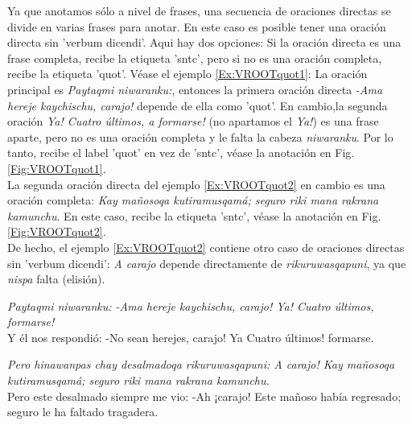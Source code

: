 \documentclass[a4paper,11pt,DIV12]{scrartcl}
\begin{document}
Ya que anotamos s\'olo a nivel de frases, una secuencia de oraciones directas se divide en varias frases para anotar. En este caso es posible tener una oraci\'on directa sin 'verbum dicendi'. Aqui hay dos opciones: Si la oraci\'on directa es una frase completa, recibe la etiqueta 'sntc', pero si no es una oraci\'on completa, recibe la etiqueta 'quot'. V\'ease el ejemplo \ref{Ex:VROOTquot1}: La oraci\'on principal es {\em Paytaqmi niwaranku:}, entonces la primera oraci\'on directa {\em -Ama hereje kaychischu, carajo!} depende de ella como 'quot'. En cambio,la segunda oraci\'on {\em Ya! Cuatro \'ultimos, a formarse!} (no apartamos el {\em Ya!}) es una frase aparte, pero no es una oraci\'on completa y le falta la cabeza {\em niwaranku}.
Por lo tanto, recibe el label 'quot' en vez de 'sntc', v\'ease la anotaci\'on en Fig. \ref{Fig:VROOTquot1}.\\
La segunda oraci\'on directa del ejemplo \ref{Ex:VROOTquot2} en cambio es una oraci\'on completa: {\em Kay mañosoqa kutiramusqamá; seguro riki mana rakrana kamunchu}. En este caso, recibe la etiqueta 'sntc', v\'ease la anotaci\'on en Fig. \ref{Fig:VROOTquot2}.\\
De hecho, el ejemplo \ref{Ex:VROOTquot2} contiene otro caso de oraciones directas sin 'verbum dicendi': {\em A carajo} depende directamente de {\em rikuruwasqapuni}, ya que {\em nispa} falta (elisi\'on). 
\begin{examples}
 \item\label{Ex:VROOTquot1} {\em Paytaqmi niwaranku: -Ama hereje kaychischu, carajo! Ya! Cuatro \'ultimos, formarse!}\\
    Y \'el nos respondi\'o: -No sean herejes, {\textexclamdown}carajo! {\textexclamdown}Ya Cuatro \'ultimos! formarse.
  \item\label{Ex:VROOTquot2}  {\em Pero hinawanpas chay desalmadoqa rikuruwasqapuni: A carajo! Kay mañosoqa kutiramusqamá; seguro riki mana rakrana kamunchu.}\\
	Pero este desalmado siempre me vio: -Ah ¡carajo! Este mañoso había regresado; seguro le ha faltado tragadera.                                             
\end{examples}
\end{document}
